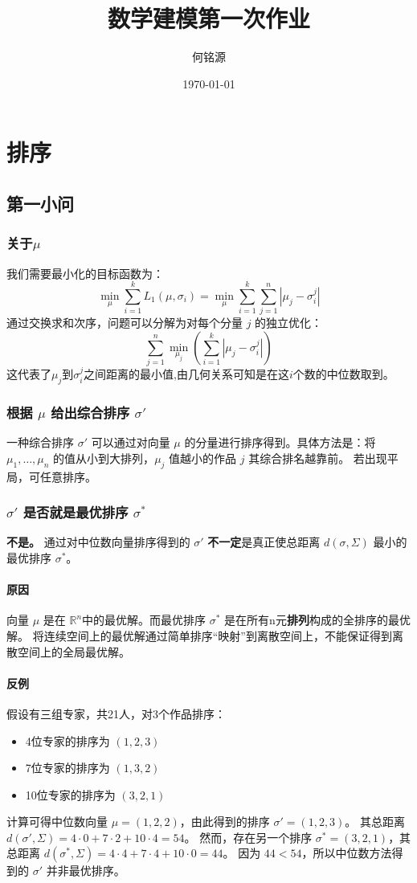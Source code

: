 \documentclass{ctexart}
\author{何铭源}
\date{\today}
\title{数学建模第一次作业}
\begin{document}
\maketitle
\setlength{\parindent}{0pt}
\section{排序}
\subsection{第一小问}
\subsubsection{关于$\mu$}
我们需要最小化的目标函数为：
$$ \min_{\mu} \sum_{i=1}^{k} L_1(\mu, \sigma_i) = \min_{\mu} \sum_{i=1}^{k} \sum_{j=1}^{n} |\mu_j - \sigma_i^j| $$
通过交换求和次序，问题可以分解为对每个分量 $j$ 的独立优化：
$$ \sum_{j=1}^{n} \min_{\mu_j} \left( \sum_{i=1}^{k} |\mu_j - \sigma_i^j| \right) $$
这代表了$\mu_j$到$\sigma_i^j$之间距离的最小值,由几何关系可知是在这$i$个数的中位数取到。

\subsubsection{根据 $\mu$ 给出综合排序 $\sigma'$}
一种综合排序 $\sigma'$ 可以通过对向量 $\mu$ 的分量进行排序得到。具体方法是：将 $\mu_1, \dots, \mu_n$ 的值从小到大排列，$\mu_j$ 值越小的作品 $j$ 其综合排名越靠前。
若出现平局，可任意排序。

\subsubsection{$\sigma'$ 是否就是最优排序 $\sigma^*$}
\textbf{不是。} 通过对中位数向量排序得到的 $\sigma'$ \textbf{不一定}是真正使总距离 $d(\sigma, \Sigma)$ 最小的最优排序 $\sigma^*$。
\paragraph{原因}
向量 $\mu$ 是在 $\mathbb{R}^n$中的最优解。而最优排序 $\sigma^*$ 是在所有n元\textbf{排列}构成的全排序的最优解。
将连续空间上的最优解通过简单排序“映射”到离散空间上，不能保证得到离散空间上的全局最优解。
\paragraph{反例}
假设有三组专家，共21人，对3个作品排序：
\begin{itemize}
    \item 4位专家的排序为 $(1, 2, 3)$
    \item 7位专家的排序为 $(1, 3, 2)$
    \item 10位专家的排序为 $(3, 2, 1)$
\end{itemize}
计算可得中位数向量 $\mu = (1, 2, 2)$，由此得到的排序 $\sigma' = (1, 2, 3)$。
其总距离 $d(\sigma', \Sigma) = 4 \cdot 0 + 7 \cdot 2 + 10 \cdot 4 = 54$。
然而，存在另一个排序 $\sigma^* = (3, 2, 1)$，其总距离 $d(\sigma^*, \Sigma) = 4 \cdot 4 + 7 \cdot 4 + 10 \cdot 0 = 44$。
因为 $44 < 54$，所以中位数方法得到的 $\sigma'$ 并非最优排序。
\end{document}
